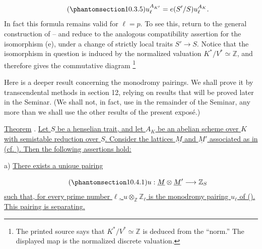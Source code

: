\begin{equation}\tag{\SGARefTarget{sga7.sga7i.eix.n10-3-5}{10.3.5}}
u_\ell^{A_{K'}}=e(S'/S)u_\ell^{A_K}.
\end{equation}
In fact this formula remains valid for $\ell=p$. To see this, return to
the general construction of -- and reduce to the analogous
compatibility assertion for the isomorphism (e), under a change of
strictly local traits $S'\longrightarrow S$. Notice that the isomorphism
in question is induced by the normalized valuation
$K^*/V^*\simeq\mathbb Z$, and therefore gives the commutative diagram
\footnote{The printed source says that $K^*/V^*\simeq\mathbb Z$ is
deduced from the ``norm.''  The displayed map is the normalized discrete
valuation.}

\begin{center}
\end{center}

Here is a deeper result concerning the monodromy pairings. We shall prove
it by transcendental methods in section 12, relying on results that will
be proved later in the Seminar. (We shall not, in fact, use  in the
remainder of the Seminar, any more than we shall use the other results of
the present expos\'e.)

\medskip
\noindent
\underline{Theorem} . \underline{Let $S$ be a henselian trait, and
let $A_K$ be an abelian scheme over $K$ with semistable reduction over
$S$. Consider the lattices $\underline M$ and $\underline M'$ associated
as in  (cf. ). Then the following assertions hold:}

\smallskip
\noindent
a) \underline{There exists a unique pairing}

\begin{equation}\tag{\SGARefTarget{sga7.sga7i.eix.n10-4-1}{10.4.1}}
u:\underline M\otimes\underline M'\longrightarrow\mathbb Z_S
\end{equation}
\underline{such that, for every prime number $\ell$,
$u\otimes_{\mathbb Z}\mathbb Z_\ell$ is the monodromy pairing $u_\ell$
of (). This pairing is separating.}

